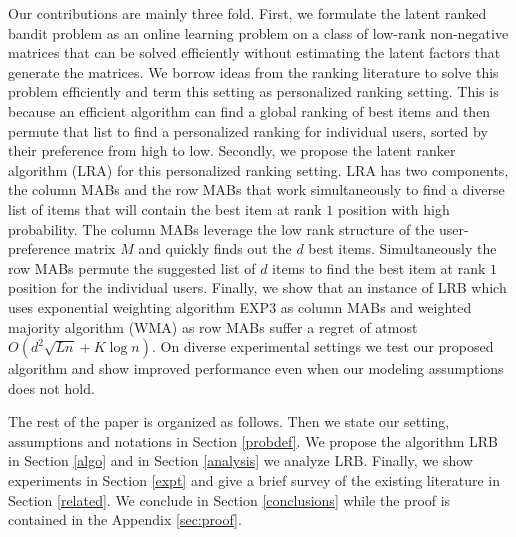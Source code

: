Our contributions are mainly three fold. First, we formulate the latent ranked bandit problem as an online learning problem on a class of low-rank non-negative matrices that can be solved efficiently without estimating the latent factors that generate the matrices. We borrow ideas from the ranking literature to solve this problem efficiently and term this setting as personalized ranking setting. This is because an efficient algorithm can find a global ranking of best items and then permute that list to find a personalized ranking for individual users, sorted by their preference from high to low. Secondly, we propose the latent ranker algorithm (LRA) for this personalized ranking setting. LRA has two components, the column MABs  and the row MABs that work simultaneously to find a diverse list of items that will contain the best item at rank $1$ position with high probability. The column MABs leverage the low rank structure of the user-preference matrix $M$ and quickly finds out the $d$ best items. Simultaneously the row MABs permute the suggested list of $d$ items to find the best item at rank $1$ position for the individual users. Finally, we show that an instance of LRB which uses exponential weighting algorithm EXP3 as column MABs and weighted majority algorithm (WMA) as row MABs suffer a regret of atmost $O\left(d^2\sqrt{L n} + K \log n\right)$. On diverse experimental settings we test our proposed algorithm and show improved performance even when our modeling assumptions does not hold.

	The rest of the paper is organized as follows. Then we state our setting, assumptions and notations in Section \ref{probdef}. We propose the algorithm LRB in Section \ref{algo} and in Section \ref{analysis} we analyze LRB. Finally, we show experiments in Section \ref{expt} and give a brief survey of the existing literature in Section \ref{related}. We conclude in Section \ref{conclusions} while the proof is contained in the Appendix \ref{sec:proof}.